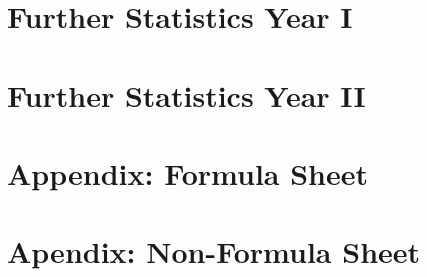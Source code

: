 \documentclass{book}
\theoremstyle{plain}
\theoremstyle{definition}
\begin{document}
\chapter{Further Statistics Year I} \label{ch:statistics_i}
    

\chapter{Further Statistics Year II} \label{ch:statistics_ii}
    

\appendix
\chapter{Appendix: Formula Sheet} \label{ch:formula_sheet}
    

\chapter{Apendix: Non-Formula Sheet} \label{ch:non_formula_sheet}
    

\printnoidxglossary
\end{document}
